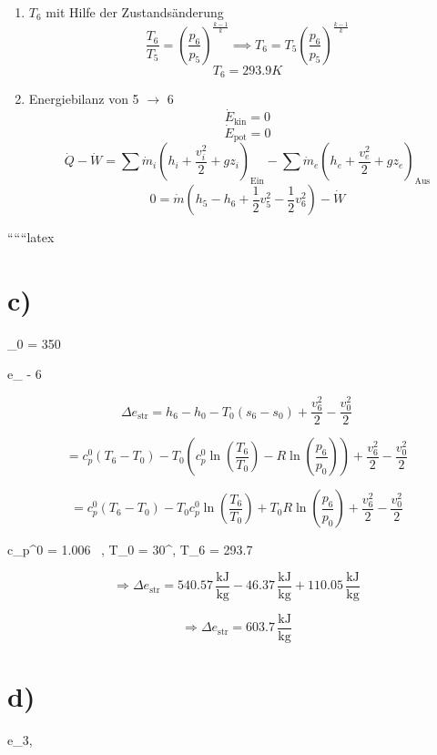 \begin{enumerate}
    \item $T_6$ mit Hilfe der Zustandsänderung \\
    \[
    \frac{T_6}{T_5} = \left( \frac{p_6}{p_5} \right)^{\frac{k-1}{k}} \implies T_6 = T_5 \left( \frac{p_6}{p_5} \right)^{\frac{k-1}{k}}
    \]
    \[
    T_6 = 293.9 K
    \]

    \item Energiebilanz von 5 $\rightarrow$ 6 \\
    \[
    \dot{E}_{\text{kin}} = 0
    \]
    \[
    \dot{E}_{\text{pot}} = 0
    \]
    \[
    \dot{Q} - \dot{W} = \sum \dot{m}_i \left( h_i + \frac{v_i^2}{2} + gz_i \right)_{\text{Ein}} - \sum \dot{m}_e \left( h_e + \frac{v_e^2}{2} + gz_e \right)_{\text{Aus}}
    \]
    \[
    0 = \dot{m} \left( h_5 - h_6 + \frac{1}{2} v_5^2 - \frac{1}{2} v_6^2 \right) - \dot{W}
    \]
\end{enumerate}

``````latex


\section*{c)}
 \quad {}_0 = 350 \, 

 \quad \Delta e_{} \quad {}  - 6 \quad \Rightarrow {}

\[
\Delta e_{\text{str}} = h_6 - h_0 - T_0 (s_6 - s_0) + \frac{v_6^2}{2} - \frac{v_0^2}{2}
\]

\[
= c_p^0 (T_6 - T_0) - T_0 \left( c_p^0 \ln \left( \frac{T_6}{T_0} \right) - R \ln \left( \frac{p_6}{p_0} \right) \right) + \frac{v_6^2}{2} - \frac{v_0^2}{2}
\]

\[
= c_p^0 (T_6 - T_0) - T_0 c_p^0 \ln \left( \frac{T_6}{T_0} \right) + T_0 R \ln \left( \frac{p_6}{p_0} \right) + \frac{v_6^2}{2} - \frac{v_0^2}{2}
\]

 \quad c_p^0 = 1.006 \, , \quad T_0 = 30^\circ {}, \quad T_6 = 293.7 \, 

\[
\Rightarrow \Delta e_{\text{str}} = 540.57 \, \frac{\text{kJ}}{\text{kg}} - 46.37 \, \frac{\text{kJ}}{\text{kg}} + 110.05 \, \frac{\text{kJ}}{\text{kg}}
\]

\[
\Rightarrow \Delta e_{\text{str}} = 603.7 \, \frac{\text{kJ}}{\text{kg}}
\]

\section*{d)}
 \quad e_{3, }


